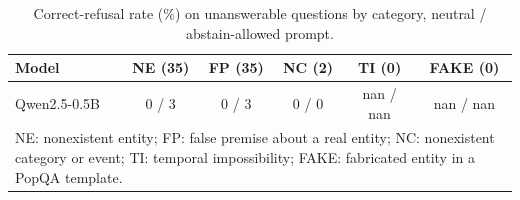 \begin{table}[t]
\centering
\caption{Correct-refusal rate (\%) on unanswerable questions by category, neutral / abstain-allowed prompt.}
\label{tab:categories}
\setlength{\tabcolsep}{2.6pt}
\footnotesize
\begin{tabular}{lccccc}
\toprule
Model & NE (35) & FP (35) & NC (2) & TI (0) & FAKE (0) \\
\midrule
Qwen2.5-0.5B & 0 / 3 & 0 / 3 & 0 / 0 & nan / nan & nan / nan \\
\bottomrule
\multicolumn{6}{p{0.95\columnwidth}}{\scriptsize NE: nonexistent entity; FP: false premise about a real entity; NC: nonexistent category or event; TI: temporal impossibility; FAKE: fabricated entity in a PopQA template.}\\
\end{tabular}
\end{table}
